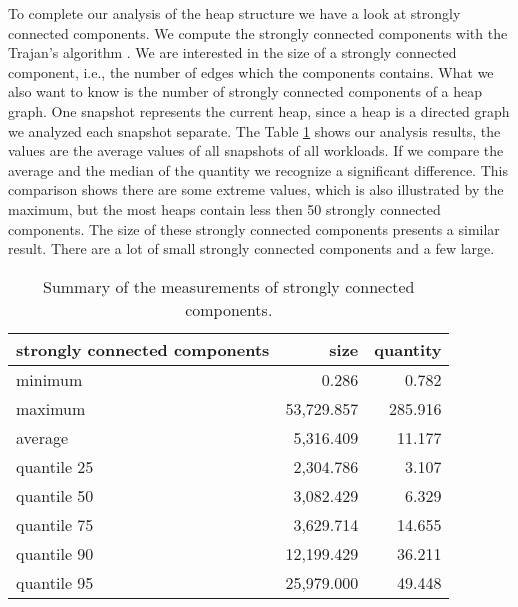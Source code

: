 To complete our analysis of the heap structure we have a look at strongly connected components. We compute the strongly connected components with the Trajan's algorithm \cite{Trajan}. We are interested in the size of a strongly connected component, i.e., the number of edges which the components contains. What we also want to know is the number of strongly connected components of a heap graph. One snapshot represents the current heap, since a heap is a directed graph we analyzed each snapshot separate. The Table \ref{tab:scc_stats} shows our analysis results, the values are the average values of all snapshots of all workloads. If we compare the average and the median of the quantity we recognize a significant difference. This comparison shows there are some extreme values, which is also illustrated by the maximum, but the most heaps contain less then 50 strongly connected components. The size of these strongly connected components presents a similar result. There are a lot of small strongly connected components and a few large.
\begin{table}
	\small
	\centering
	\begin{tabular}{l r r}
		\toprule
		\textbf{strongly connected components} & \textbf{size} & \textbf{quantity} \\ \midrule
		minimum							&	0.286		&	0.782			\\ 
		maximum							&	53,729.857	&	285.916			\\ 
		average							&	5,316.409	&	11.177			\\ 
		quantile 25						&	2,304.786	&	3.107			\\ 
		quantile 50						&	3,082.429	&	6.329			\\ 
		quantile 75						&	3,629.714	&	14.655			\\ 
		quantile 90						&	12,199.429	&	36.211			\\ 
		quantile 95						&	25,979.000	&	49.448			\\ \bottomrule
	\end{tabular}
	\caption{Summary of the measurements of strongly connected components.}
	\label{tab:scc_stats}
\end{table}